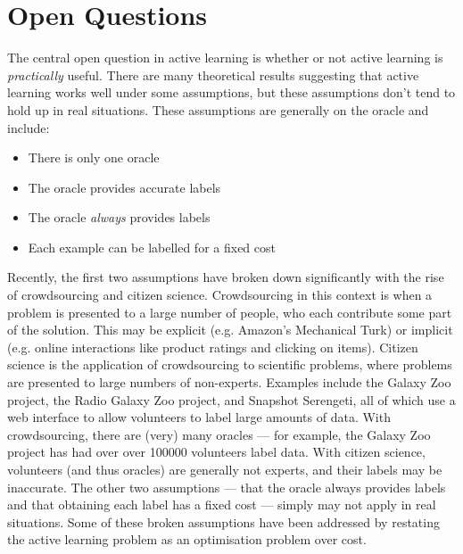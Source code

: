 \documentclass[a4paper]{article}
\begin{document}
    \section{Open Questions}
        The central open question in active learning is whether or not active learning is \emph{practically} useful. There are many theoretical results suggesting that active learning works well under some assumptions, but these assumptions don't tend to hold up in real situations. These assumptions are generally on the oracle and include\cite{donmez08,settles11}:
        \begin{itemize}
            \item There is only one oracle
            \item The oracle provides accurate labels
            \item The oracle \emph{always} provides labels
            \item Each example can be labelled for a fixed cost
        \end{itemize}
        Recently, the first two assumptions have broken down significantly with the rise of crowdsourcing and citizen science. Crowdsourcing in this context is when a problem is presented to a large number of people, who each contribute some part of the solution. This may be explicit (e.g. Amazon's Mechanical Turk) or implicit (e.g. online interactions like product ratings and clicking on items)\cite{yan11}. Citizen science is the application of crowdsourcing to scientific problems, where problems are presented to large numbers of non-experts. Examples include the Galaxy Zoo project\cite{lintott08}, the Radio Galaxy Zoo project\cite{banfield15}, and Snapshot Serengeti\cite{swanson15}, all of which use a web interface to allow volunteers to label large amounts of data. With crowdsourcing, there are (very) many oracles --- for example, the Galaxy Zoo project has had over over 100000 volunteers label data\cite{lintott08}. With citizen science, volunteers (and thus oracles) are generally not experts, and their labels may be inaccurate. The other two assumptions --- that the oracle always provides labels and that obtaining each label has a fixed cost --- simply may not apply in real situations\cite{donmez08,settles11}. Some of these broken assumptions have been addressed by restating the active learning problem as an optimisation problem over cost\cite{donmez08}.
\end{document}
